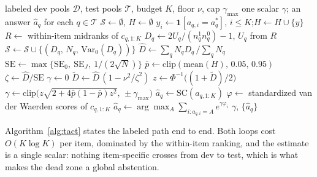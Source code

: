 \documentclass{article}
\newcommand{\Dhat}{\widehat{D}}
\newcommand{\TACT}{\textsc{tact}}
\begin{document}
\begin{algorithm}[t]
\caption{\TACT{}: derive the exponent, then vote}
\label{alg:tact}
\begin{algorithmic}[1]
\Require labeled dev pools $\mathcal{D}$, test pools $\mathcal{T}$, budget $K$,
floor $\nu$, cap $\gamma_{\max}$
\Ensure one scalar $\gamma$; an answer $\hat a_q$ for each $q\in\mathcal{T}$
\State $\mathcal{S}\gets\emptyset$,\; $H\gets\emptyset$
  \State $y_i\gets\mathbf{1}[a_{q,i}=a^\ast_q]$,\; $i\le K$;\quad $H\gets H\cup\{y\}$
   
    \State $R\gets$ within-item midranks of $c_{q,1:K}$
    \State $D_q\gets 2U_q/(n^1_qn^0_q)-1$, \; $U_q$ from $R$
    \State $\mathcal{S}\gets\mathcal{S}\cup\{(D_q,\,N_q,\,\mathrm{Var}_0(D_q))\}$
  \EndIf
\EndFor
\State $\Dhat\gets\sum_q N_qD_q\,/\sum_q N_q$ 
\State $\mathrm{SE}\gets\max\{\mathrm{SE}_0,\ \mathrm{SE}_J,\ 1/(2\sqrt{N})\}$
\State $\bar p\gets\mathrm{clip}(\mathrm{mean}(H),\,0.05,\,0.95)$
\State $\zeta\gets\Dhat/\mathrm{SE}$
\If{$|\zeta|\le\nu$} 
  \State $\gamma\gets 0$
\Else
  \State $\tilde D\gets\Dhat\,(1-\nu^2/\zeta^2)$ 
  \State $z\gets\Phi^{-1}\big((1+\tilde D)/2\big)$
  \State $\gamma\gets\mathrm{clip}\big(z\sqrt{2+4\bar p(1-\bar p)z^2},\,\pm\gamma_{\max}\big)$
\EndIf
{}
    \State $\hat a_q\gets\mathrm{SC}(a_{q,1:K})$ 
  \Else
    \State $\varphi\gets$ standardized van der Waerden scores of $c_{q,1:K}$
    \State $\hat a_q\gets\arg\max_A\sum_{i:a_{q,i}=A}e^{\gamma\varphi_i}$
  \EndIf
\EndFor
\State \Return $\gamma$, $\{\hat a_q\}$
\end{algorithmic}
\end{algorithm}

Algorithm~\ref{alg:tact} states the labeled path end to end. Both loops cost
$O(K\log K)$ per item, dominated by the within-item ranking, and the estimate
is a single scalar: nothing item-specific crosses from dev to test, which is
what makes the dead zone a global abstention.
\end{document}
